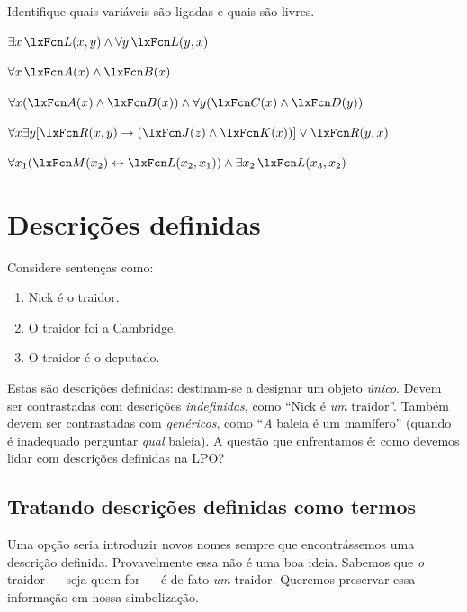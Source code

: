 \practiceproblems
\problempart
\label{pr.freeFOL}
Identifique quais variáveis são ligadas e quais são livres.
\begin{compactlist}
\item $\exists x\, \atom{L}{x,y} \eand \forall y\, \atom{L}{y,x}$
\item $\forall x\, \atom{A}{x} \eand \atom{B}{x}$
\item $\forall x (\atom{A}{x} \eand \atom{B}{x}) \eand \forall y(\atom{C}{x} \eand \atom{D}{y})$
\item $\forall x\exists y[\atom{R}{x,y} \eif (\atom{J}{z} \eand \atom{K}{x})] \eor \atom{R}{y,x}$
\item $\forall x_1(\atom{M}{x_2} \eiff \atom{L}{x_2,x_1}) \eand \exists x_2\,\atom{L}{x_3,x_2}$
\end{compactlist}


\chapter{Descrições definidas}\label{subsec.defdesc}
Considere sentenças como:
	\begin{enumerate}
\item\label{traitor1} Nick é o traidor.
\item\label{traitor2} O traidor foi a Cambridge.
\item\label{traitor3} O traidor é o deputado.
	\end{enumerate}
Estas são descrições definidas: destinam-se a designar um objeto \emph{único}. Devem ser contrastadas com descrições \emph{indefinidas}, como \textquotedblleft Nick é \emph{um} traidor\textquotedblright{}. Também devem ser contrastadas com \emph{genéricos}, como \textquotedblleft \emph{A} baleia é um mamífero\textquotedblright{} (quando é inadequado perguntar \emph{qual} baleia). A questão que enfrentamos é: como devemos lidar com descrições definidas na LPO?


\section{Tratando descrições definidas como termos}
Uma opção seria introduzir novos nomes sempre que encontrássemos uma descrição definida. Provavelmente essa não é uma boa ideia. Sabemos que \emph{o} traidor — seja quem for — é de fato \emph{um} traidor. Queremos preservar essa informação em nossa simbolização.

